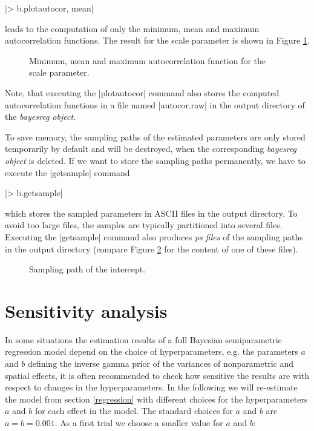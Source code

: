 \documentclass[a4paper]{article}
\begin{document}
|> b.plotautocor, mean|

leads to the computation of only the minimum, mean and maximum
autocorrelation functions. The result for the scale parameter is
shown in Figure \ref{autocor2}.

\begin{figure}[ht]
\begin{center}
{\it\caption{Minimum, mean and maximum autocorrelation function
for the scale parameter.\label{autocor2}}}
\end{center}
\end{figure}

Note, that executing the |plotautocor| command also stores the computed autocorrelation functions in a file named |autocor.raw|
in the output directory of the {\it bayesreg object}.

To save memory, the sampling paths of the estimated parameters are only stored temporarily by default and will be destroyed,
when the corresponding {\em bayesreg object} is deleted. If we want to store the sampling paths permanently, we have to execute
the |getsample| command

|> b.getsample|

which stores the sampled parameters in ASCII files in the output directory. To avoid too large files, the samples are typically
partitioned into several files. Executing the |getsample| command also produces {\em ps files} of the sampling paths in the
output directory (compare Figure \ref{sample1} for the content of one of these files).

\begin{figure}[ht]
\begin{center}
{\it\caption{Sampling path of the intercept.\label{sample1}}}
\end{center}
\end{figure}

\section{Sensitivity analysis}\label{sensitivity}

In some situations the estimation results of a full Bayesian
semiparametric regression model depend on the choice of
hyperparameters, e.g. the parameters $a$ and $b$ defining the
inverse gamma prior of the variances of nonparametric and spatial
effects, it is often recommended to check how sensitive the
results are with respect to changes in the hyperparameters. In the
following we will re-estimate the model from section
\ref{regression} with different choices for the hyperparameters
$a$ and $b$ for each effect in the model. The standard choices for
$a$ and $b$ are $a=b=0.001$. As a first trial we choose a smaller
value for $a$ and $b$:
\end{document}

